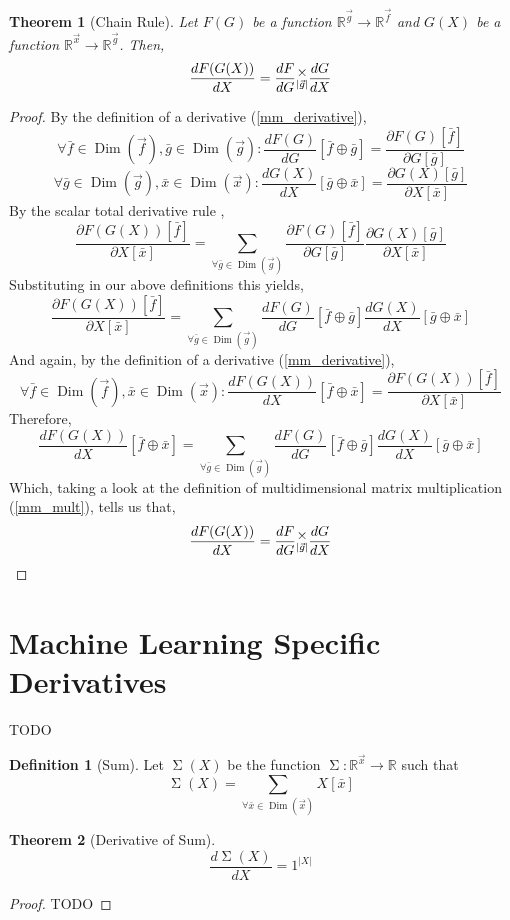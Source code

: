 \documentclass[12pt]{article}
\theoremstyle{definition}
\newtheorem{definition}{Definition}[section]
\theoremstyle{plain}
\newtheorem{theorem}{Theorem}[section]
\theoremstyle{ppart}
\DeclareMathOperator{\Dim}{Dim}
\DeclareMathOperator{\Sum}{\Sigma}
\newcommand{\mmult}[1]{\text{\raisebox{1ex}{$\underset{#1}{\times}$}}}
\begin{document}
\begin{theorem}[Chain Rule]
\label{mmm_chain_rule}
Let $F(G)$ be a function $\mathbb{R}^{\vec{g}} \rightarrow \mathbb{R}^{\vec{f}}$
and $G(X)$ be a function $\mathbb{R}^{\vec{x}} \rightarrow \mathbb{R}^{\vec{g}}$.
Then,
\[
\frac{dF(G(X))}{dX} = \frac{dF}{dG} \mmult{|\vec{g}|} \frac{dG}{dX}
\]
\end{theorem}
\begin{proof}
By the definition of a derivative (\ref{mm_derivative}),
\[
\forall \bar{f} \in \Dim(\vec{f}), \bar{g} \in \Dim(\vec{g}):
\frac{dF(G)}{dG}[\bar{f} \oplus \bar{g}]
= \frac{\partial F(G)[\bar{f}]}{\partial G[\bar{g}]}
\]
\[
\forall \bar{g} \in \Dim(\vec{g}), \bar{x} \in \Dim(\vec{x}):
\frac{dG(X)}{dX}[\bar{g} \oplus \bar{x}]
= \frac{\partial G(X)[\bar{g}]}{\partial X[\bar{x}]}
\]
By the scalar total derivative rule \cite{wiki:totalderiv},
\[
\frac{\partial F(G(X))[\bar{f}]}{\partial X[\bar{x}]}
= \sum_{\forall \bar{g} \in \Dim(\vec{g})} 
\frac{\partial F(G)[\bar{f}]}{\partial G[\bar{g}]}
\frac{\partial G(X)[\bar{g}]}{\partial X[\bar{x}]}
\]
Substituting in our above definitions this yields,
\[
\frac{\partial F(G(X))[\bar{f}]}{\partial X[\bar{x}]}
= \sum_{\forall \bar{g} \in \Dim(\vec{g})} 
\frac{dF(G)}{dG}[\bar{f} \oplus \bar{g}]
\frac{dG(X)}{dX}[\bar{g} \oplus \bar{x}]
\]
And again, by the definition of a derivative (\ref{mm_derivative}),
\[
\forall \bar{f} \in \Dim(\vec{f}), \bar{x} \in \Dim(\vec{x}):
\frac{dF(G(X))}{dX}[\bar{f} \oplus \bar{x}]
= \frac{\partial F(G(X))[\bar{f}]}{\partial X[\bar{x}]}
\]
Therefore,
\[
\frac{dF(G(X))}{dX}[\bar{f} \oplus \bar{x}]
= \sum_{\forall \bar{g} \in \Dim(\vec{g})} 
\frac{dF(G)}{dG}[\bar{f} \oplus \bar{g}]
\frac{dG(X)}{dX}[\bar{g} \oplus \bar{x}]
\]
Which, taking a look at the definition of multidimensional matrix multiplication
(\ref{mm_mult}), tells us that,
\[
\frac{dF(G(X))}{dX} = \frac{dF}{dG} \mmult{|\vec{g}|} \frac{dG}{dX}
\]
\end{proof}

\section{Machine Learning Specific Derivatives}
TODO

\begin{definition}[Sum]
Let $\Sum(X)$ be the function $\Sum : \mathbb{R}^{\vec{x}} \to \mathbb{R}$
such that \[ \Sum(X) = \sum_{\forall \bar{x} \in \Dim(\vec{x})} X[\bar{x}] \]
\end{definition}

\begin{theorem}[Derivative of Sum]
\[\frac{d\Sum(X)}{dX} = 1^{|X|}\]
\end{theorem}
\begin{proof}
TODO
\end{proof}
\end{document}
